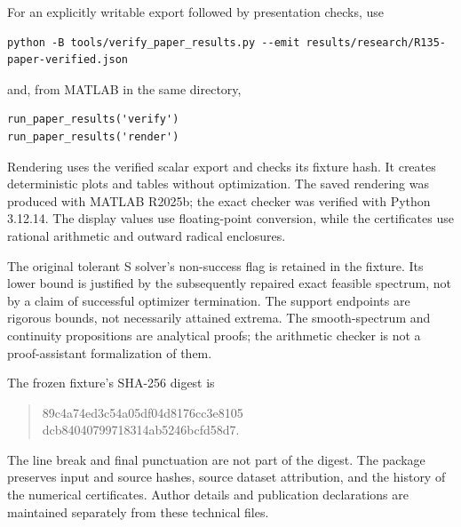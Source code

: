 \documentclass[9pt]{osa-supplemental-document}
\begin{document}
For an explicitly writable export followed by presentation checks, use
{\footnotesize
\begin{verbatim}
python -B tools/verify_paper_results.py --emit results/research/R135-paper-verified.json
\end{verbatim}
}
and, from MATLAB in the same directory,
\begin{verbatim}
run_paper_results('verify')
run_paper_results('render')
\end{verbatim}
Rendering uses the verified scalar export and checks its fixture hash. It creates deterministic plots and tables without optimization. The saved rendering was produced with MATLAB R2025b; the exact checker was verified with Python 3.12.14. The display values use floating-point conversion, while the certificates use rational arithmetic and outward radical enclosures.

The original tolerant S solver's non-success flag is retained in the fixture. Its lower bound is justified by the subsequently repaired exact feasible spectrum, not by a claim of successful optimizer termination. The support endpoints are rigorous bounds, not necessarily attained extrema. The smooth-spectrum and continuity propositions are analytical proofs; the arithmetic checker is not a proof-assistant formalization of them.

The frozen fixture's SHA-256 digest is
\begin{quote}\ttfamily\small
89c4a74ed3c54a05df04d8176cc3e8105\\
dcb84040799718314ab5246bcfd58d7.
\end{quote}
The line break and final punctuation are not part of the digest. The package preserves input and source hashes, source dataset attribution, and the history of the numerical certificates. Author details and publication declarations are maintained separately from these technical files.
\end{document}
